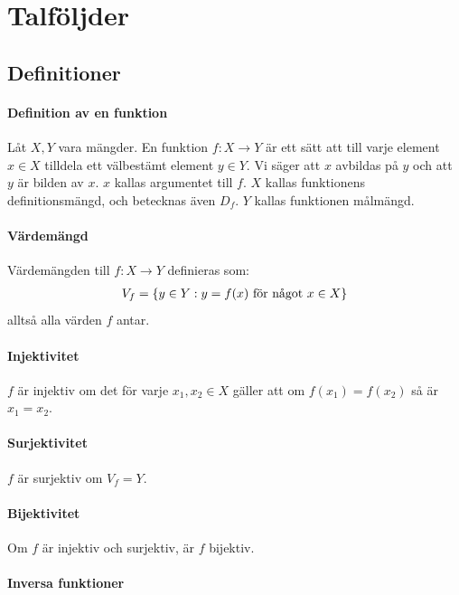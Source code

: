 \section{Talföljder}

\subsection{Definitioner}

\paragraph{Definition av en funktion}

Låt $X, Y$ vara mängder. En funktion $f: X\to Y$ är ett sätt att till varje element $x \in X$ tilldela ett välbestämt element $y\in Y$. Vi säger att $x$ avbildas på $y$ och att $y$ är bilden av $x$. $x$ kallas argumentet till $f$. $X$ kallas funktionens definitionsmängd, och betecknas även $D_f$. $Y$ kallas funktionen målmängd.

\paragraph{Värdemängd}

Värdemängden till $f: X\rightarrow Y$ definieras som:
\begin{align}
	V_f=\left \{y\in Y: y=f(x)\textnormal{ för något }x\in X\right \}\nonumber
\end{align}
alltså alla värden $f$ antar.

\paragraph{Injektivitet}

$f$ är injektiv om det för varje $x_1, x_2 \in X$ gäller att om $f(x_1)=f(x_2)$ så är $x_1=x_2$.

\paragraph{Surjektivitet}

$f$ är surjektiv om $V_f=Y$.

\paragraph{Bijektivitet}

Om $f$ är injektiv och surjektiv, är $f$ bijektiv.

\paragraph{Inversa funktioner}

